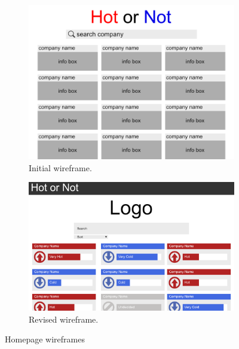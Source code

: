         \begin{figure}[!h]
            \begin{subfigure}[b]{0.4\textwidth}
                \includegraphics[width=\textwidth]{images/upload/Home Wireframe.png}
                \caption{Initial wireframe.}
                \label{fig:homepage_initial}
            \end{subfigure}
            \hfill
            \begin{subfigure}[b]{0.4\textwidth}
                \includegraphics[width=\textwidth]{images/upload/Home-wireframe2.png}
                \caption{Revised wireframe.}
                \label{fig:hompage_revised}
                \end{subfigure}
            \caption{Homepage wireframes}
        \end{figure}
        
